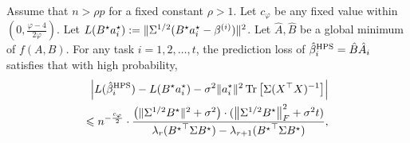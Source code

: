 \begin{theorem}\label{thm_many_tasks}
	Assume that $n > \rho p$ for a fixed constant $\rho > 1$.
	Let $c_{\varphi}$ be any fixed value within $(0, \frac{\varphi-4}{2\varphi})$.
	Let $L(B^{\star}a_i^{\star}): = \|\Sigma^{1/2} (B^{\star} a_i^{\star}- \beta^{(i)})\|^2$.
	Let $\hat{A}, \hat{B}$ be a global minimum of $f(A, B)$.
	For any task $i = 1, 2, \dots, t$, the prediction loss of $\hat{\beta}_i^{\textup{HPS}} = \hat{B} \hat{A}_i$ satisfies that with high probability,
	\begin{align*}
		{\left| {L(\hat{\beta}_i^{\textup{HPS}}) - L(B^{\star}a_i^{\star}) - \sigma^2 \|a_i^{\star}\|^2 \operatorname{Tr}\left[\Sigma (X^{\top}X)^{-1}\right]} \right|} \\
		\leqslant n^{-\frac{c_{\varphi}}2} \cdot \frac{\left({ \|\Sigma^{1/2} B^{\star}\|^2+  \sigma^2}\right) \cdot (\left\| \Sigma^{1/2} B^{\star} \right\|_{F}^2 + \sigma^2 t)} {\lambda_r ({B^\star}^\top \Sigma B^\star)- \lambda_{r+1}({B^\star}^\top \Sigma B^\star)},
	\end{align*}
\end{theorem}

